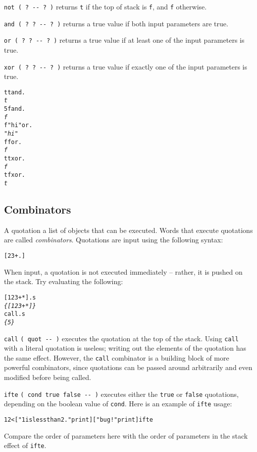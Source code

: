 \documentclass[english]{article}
\begin{document}
\texttt{not ( ? -{}- ? )} returns \texttt{t} if the top of stack is \texttt{f}, and \texttt{f} otherwise.

\texttt{and ( ? ? -{}- ? )} returns a true value if both input parameters are true.

\texttt{or ( ? ? -{}- ? )} returns a true value if at least one of the input parameters is true.

\texttt{xor ( ? ? -{}- ? )} returns a true value if exactly one of the input parameters is true.

\begin{alltt}
t t and .
\emph{t}
5 f and .
\emph{f}
f "hi" or .
\emph{"hi"}
f f or .
\emph{f}
t t xor .
\emph{f}
t f xor .
\emph{t}
\end{alltt}

\subsection{Combinators}

A quotation a list of objects that can be executed. Words that execute quotations are called \emph{combinators}. Quotations are input
using the following syntax:

\begin{alltt}
{[} 2 3 + . {]}
\end{alltt}
When input, a quotation is not executed immediately -- rather, it
is pushed on the stack. Try evaluating the following:

\begin{alltt}
{[} 1 2 3 + {*} {]} .s
\emph{\{ {[} 1 2 3 + {*} {]} \}}
call .s
\emph{\{ 5 \}}
\end{alltt}

\texttt{call} \texttt{( quot -{}- )} executes the quotation at the
top of the stack. Using \texttt{call} with a literal quotation is
useless; writing out the elements of the quotation has the same effect.
However, the \texttt{call} combinator is a building block of more
powerful combinators, since quotations can be passed around arbitrarily
and even modified before being called.

\texttt{ifte} \texttt{( cond true false -{}- )} executes either the
\texttt{true} or \texttt{false} quotations, depending on the boolean
value of \texttt{cond}. Here is an example of \texttt{ifte} usage:

\begin{alltt}
1 2 < {[} "1 is less than 2." print {]} {[} "bug!" print {]} ifte
\end{alltt}
Compare the order of parameters here with the order of parameters in
the stack effect of \texttt{ifte}.
\end{document}
